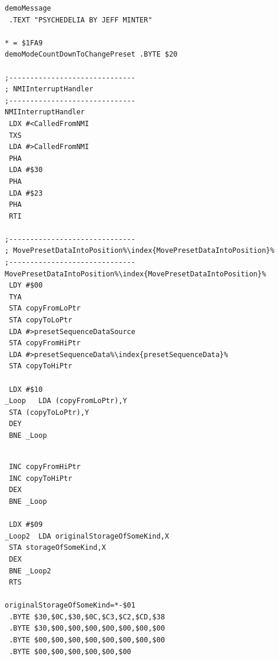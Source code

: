 \begin{minipage}[b]{0.33\linewidth}
\begin{lrbox}{\mybox}
\begin{lstlisting}[basicstyle=\ttfamily\tiny,escapechar=\%]
demoMessage
 .TEXT "PSYCHEDELIA BY JEFF MINTER"

* = $1FA9
demoModeCountDownToChangePreset .BYTE $20

;------------------------------
; NMIInterruptHandler
;------------------------------
NMIInterruptHandler
 LDX #<CalledFromNMI
 TXS
 LDA #>CalledFromNMI
 PHA
 LDA #$30
 PHA
 LDA #$23
 PHA
 RTI

;------------------------------
; MovePresetDataIntoPosition%\index{MovePresetDataIntoPosition}%
;------------------------------
MovePresetDataIntoPosition%\index{MovePresetDataIntoPosition}%
 LDY #$00
 TYA
 STA copyFromLoPtr
 STA copyToLoPtr
 LDA #>presetSequenceDataSource
 STA copyFromHiPtr
 LDA #>presetSequenceData%\index{presetSequenceData}%
 STA copyToHiPtr

 LDX #$10
_Loop   LDA (copyFromLoPtr),Y
 STA (copyToLoPtr),Y
 DEY
 BNE _Loop
\end{lstlisting}
\end{lrbox}%
\scalebox{0.8}{\usebox{\mybox}}
\end{minipage}
\begin{minipage}[b]{0.33\linewidth}
\begin{lrbox}{\mybox}%
\begin{lstlisting}[basicstyle=\ttfamily\tiny,escapechar=\%]

 INC copyFromHiPtr
 INC copyToHiPtr
 DEX
 BNE _Loop

 LDX #$09
_Loop2  LDA originalStorageOfSomeKind,X
 STA storageOfSomeKind,X
 DEX
 BNE _Loop2
 RTS

originalStorageOfSomeKind=*-$01
 .BYTE $30,$0C,$30,$0C,$C3,$C2,$CD,$38
 .BYTE $30,$00,$00,$00,$00,$00,$00,$00
 .BYTE $00,$00,$00,$00,$00,$00,$00,$00
 .BYTE $00,$00,$00,$00,$00,$00

\end{lstlisting}
\end{lrbox}%
\scalebox{0.8}{\usebox{\mybox}}
\end{minipage}
